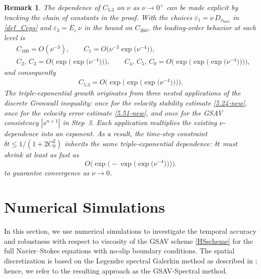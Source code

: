 \documentclass{article}
\newtheorem{remark}[theorem]{Remark}
\theoremstyle{definition}                   %
\begin{document}
\begin{remark}
\label{remark4.5}
The dependence of $C_{5.3}$ on $\nu$ as $\nu\to 0^+$ can be made explicit by
tracking the chain of constants in the proof. With the choices
$\varepsilon_1=\nu\,D_{\nu_{\max}}$ in \eqref{def_Ceps} and
$\varepsilon_3=E_\varepsilon\,\nu$ in the bound on $C_{260}$, the
leading-order behavior at each level is
\begin{align*}
&C_{100}=O(\nu^{-3}),\qquad
C_1=O\!\Big(\nu^{-3}\exp\!\big(\nu^{-4}\big)\Big),\\
&C_2,\,C_3
=O\!\Big(\exp\!\big(\exp\!\big(\nu^{-4}\big)\big)\Big),\qquad
C_4,\,C_5,\,C_0
=O\!\Big(\exp\!\big(\exp\!\big(\exp\!\big(\nu^{-4}\big)\big)\big)\Big),
\end{align*}
and consequently
\begin{align}
C_{5.3}
=O\!\Big(\exp\!\big(\exp\!\big(\exp\!\big(\nu^{-4}\big)\big)\big)\Big).
\label{C53_viscosity}
\end{align}
The triple-exponential growth originates from three nested applications of
the discrete Gronwall inequality: once for the velocity stability estimate
\eqref{5.24-new}, once for the velocity error estimate \eqref{5.51-new},
and once for the GSAV consistency $|s^{n+1}|$ in Step~3. Each application
multiplies the existing $\nu$-dependence into an exponent. As a result,
the time-step constraint $\delta t\le 1/(1+2C_0^2)$ inherits the same
triple-exponential dependence: $\delta t$ must shrink at least as fast as
\[
O\!\Big(\exp\!\big(-\exp\!\big(\exp\!\big(\nu^{-4}\big)\big)\big)\Big).
\]
to guarantee convergence as $\nu\to 0$.
\end{remark}



\section{Numerical Simulations}
\label{sec_numerical}
In this section, we use numerical simulations to investigate the temporal accuracy and robustness with respect to viscosity of the GSAV scheme \eqref{HSscheme} for the full Navier--Stokes equations with no-slip boundary conditions. The spatial discretization is based on the Legendre spectral Galerkin method as described in \cite{HuangShen2023, shen2011spectral}; hence, we refer to the resulting approach as the GSAV-Spectral method.
\end{document}
